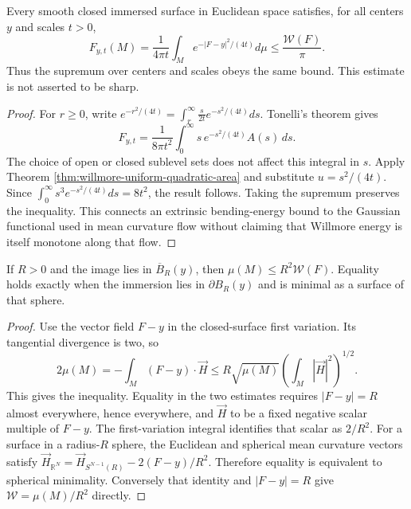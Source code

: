 \begin{corollary}\label{cor:willmore-gaussian-area-bound}
Every smooth closed immersed surface in Euclidean space satisfies, for all centers $y$ and scales $t>0$,
\[
 F_{y,t}(M)=\frac1{4\pi t}\int_Me^{-|F-y|^2/(4t)}d\mu
 \leq\frac{\mathcal W(F)}\pi.
\]
Thus the supremum over centers and scales obeys the same bound. This estimate is not asserted to be sharp.
\end{corollary}
\begin{proof}
For $r\geq0$, write $e^{-r^2/(4t)}=\int_r^\infty\frac{s}{2t}e^{-s^2/(4t)}ds$. Tonelli's theorem gives
\[
 F_{y,t}=\frac1{8\pi t^2}\int_0^\infty s\,e^{-s^2/(4t)}A(s)\,ds.
\]
The choice of open or closed sublevel sets does not affect this integral in $s$. Apply Theorem \ref{thm:willmore-uniform-quadratic-area} and substitute $u=s^2/(4t)$. Since $\int_0^\infty s^3e^{-s^2/(4t)}ds=8t^2$, the result follows. Taking the supremum preserves the inequality. This connects an extrinsic bending-energy bound to the Gaussian functional used in mean curvature flow without claiming that Willmore energy is itself monotone along that flow.
\end{proof}

\begin{proposition}\label{prop:willmore-containing-ball}
If $R>0$ and the image lies in $\overline B_R(y)$, then $\mu(M)\leq R^2\mathcal W(F)$. Equality holds exactly when the immersion lies in $\partial B_R(y)$ and is minimal as a surface of that sphere.
\end{proposition}
\begin{proof}
Use the vector field $F-y$ in the closed-surface first variation. Its tangential divergence is two, so
\[
 2\mu(M)=-\int_M(F-y)\cdot\vec H
 \leq R\sqrt{\mu(M)}\left(\int_M|\vec H|^2\right)^{1/2}.
\]
This gives the inequality. Equality in the two estimates requires $|F-y|=R$ almost everywhere, hence everywhere, and $\vec H$ to be a fixed negative scalar multiple of $F-y$. The first-variation integral identifies that scalar as $2/R^2$. For a surface in a radius-$R$ sphere, the Euclidean and spherical mean curvature vectors satisfy $\vec H_{\mathbb R^N}=\vec H_{S^{N-1}(R)}-2(F-y)/R^2$. Therefore equality is equivalent to spherical minimality. Conversely that identity and $|F-y|=R$ give $\mathcal W=\mu(M)/R^2$ directly.
\end{proof}

